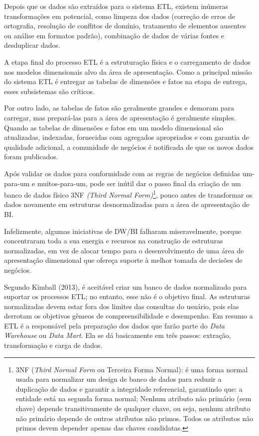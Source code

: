 Depois que os dados s\~{a}o extraídos para o sistema ETL, existem inúmeras transforma\c{c}ões em potencial, como limpeza dos dados (corre\c{c}\~{a}o de erros de ortografia, resolu\c{c}\~{a}o de conflitos de domínio, tratamento de elementos ausentes ou an\'{a}lise em formatos padr\~{a}o), combina\c{c}\~{a}o de dados de v\'{a}rias fontes e desduplicar dados. 

A etapa final do processo ETL \'{e} a estrutura\c{c}\~{a}o física e o carregamento de dados nos modelos dimensionais alvo da \'{a}rea de apresenta\c{c}\~{a}o. Como a principal miss\~{a}o do sistema ETL \'{e} entregar as tabelas de dimensões e fatos na etapa de entrega, esses subsistemas s\~{a}o críticos.

Por outro lado, as tabelas de fatos s\~{a}o geralmente grandes e demoram para carregar, mas prepar\'{a}-las para a \'{a}rea de apresenta\c{c}\~{a}o \'{e} geralmente simples. 
Quando as tabelas de dimensões e fatos em um modelo dimensional s\~{a}o atualizadas, indexadas, fornecidas com agregados apropriados e com garantia de qualidade adicional, a comunidade de negócios \'{e} notificada de que os novos dados foram publicados.

Após validar os dados para conformidade com as regras de negócios definidas um-para-um e muitos-para-um, pode ser inútil dar o passo final da cria\c{c}\~{a}o de um banco de dados físico 3NF \textit{(Third Normal Form)}\footnote{3NF (\textit{Third Normal Form} ou Terceira Forma Normal): \'{e} uma forma normal usada para normalizar um design de banco de dados para reduzir a duplica\c{c}\~{a}o de dados e garantir a integridade referencial, garantindo que: a entidade est\'{a} na segunda forma normal; Nenhum atributo n\~{a}o prim\'{a}rio (sem chave) depende transitivamente de qualquer chave, ou seja, nenhum atributo n\~{a}o prim\'{a}rio depende de outros atributos n\~{a}o primos. Todos os atributos n\~{a}o primos devem depender apenas das chaves candidatas.}, pouco antes de transformar os dados novamente em estruturas desnormalizadas para a \'{a}rea de apresenta\c{c}\~{a}o de BI.

Infelizmente, algumas iniciativas de DW/BI falharam miseravelmente, porque concentraram toda a sua energia e recursos na constru\c{c}\~{a}o de estruturas normalizadas, em vez de alocar tempo para o desenvolvimento de uma \'{a}rea de apresenta\c{c}\~{a}o dimensional que ofere\c{c}a suporte \`{a} melhor tomada de decisões de negócios. 

Segundo Kimball (2013), \'{e} aceit\'{a}vel criar um banco de dados normalizado para suportar os processos ETL; no entanto, esse n\~{a}o \'{e} o objetivo final. As estruturas normalizadas devem estar fora dos limites das consultas do usu\'{a}rio, pois elas derrotam os objetivos gêmeos de compreensibilidade e desempenho. 
Em resumo a ETL \'{e} a responsável pela preparação dos dados que farão parte
do \textit{Data Warehouse} ou \textit{Data Mart}. Ela se dá basicamente em três passos: extração, transformação e carga de dados.


